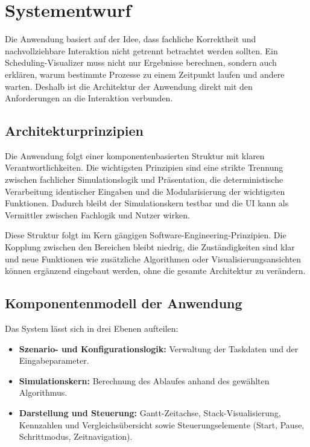 \chapter{Systementwurf}

Die Anwendung basiert auf der Idee, dass fachliche Korrektheit und nachvollziehbare Interaktion nicht getrennt betrachtet werden sollten. Ein Scheduling-Visualizer muss nicht nur Ergebnisse berechnen, sondern auch erklären, warum bestimmte Prozesse zu einem Zeitpunkt laufen und andere warten. Deshalb ist die Architektur der Anwendung direkt mit den Anforderungen an die Interaktion verbunden.

\section{Architekturprinzipien}

Die Anwendung folgt einer komponentenbasierten Struktur mit klaren Verantwortlichkeiten. Die wichtigsten Prinzipien sind eine strikte Trennung zwischen fachlicher Simulationslogik und Präsentation, die deterministische Verarbeitung identischer Eingaben und die Modularisierung der wichtigsten Funktionen. Dadurch bleibt der Simulationskern testbar und die UI kann als Vermittler zwischen Fachlogik und Nutzer wirken.

Diese Struktur folgt im Kern gängigen Software-Engineering-Prinzipien. Die Kopplung zwischen den Bereichen bleibt niedrig, die Zuständigkeiten sind klar und neue Funktionen wie zusätzliche Algorithmen oder Visualisierungsansichten können ergänzend eingebaut werden, ohne die gesamte Architektur zu verändern.

\section{Komponentenmodell der Anwendung}

Das System lässt sich in drei Ebenen aufteilen:

\begin{itemize}
    \item \textbf{Szenario- und Konfigurationslogik:} Verwaltung der Taskdaten und der Eingabeparameter.
    \item \textbf{Simulationskern:} Berechnung des Ablaufes anhand des gewählten Algorithmus.
    \item \textbf{Darstellung und Steuerung:} Gantt-Zeitachse, Stack-Visualisierung, Kennzahlen und Vergleichsübersicht sowie Steuerungselemente (Start, Pause, Schrittmodus, Zeitnavigation).
\end{itemize}

